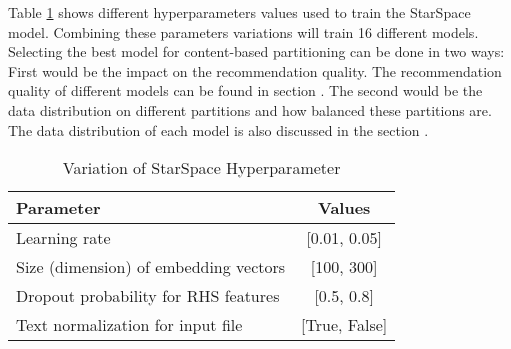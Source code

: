 Table \ref{tab:hyperparameter-variations} shows different hyperparameters values used to train the StarSpace model. Combining these parameters variations will train 16 different models. Selecting the best model for content-based partitioning can be done in two ways: First would be the impact on the recommendation quality. The recommendation quality of different models can be found in section . The second would be the data distribution on different partitions and how balanced these partitions are. The data distribution of each model is also discussed in the section .


\begin{table}[!h]
	\centering
	\caption{Variation of StarSpace Hyperparameter}
	\label{tab:hyperparameter-variations}
	\begin{tabular}{|l|c|}
		\hline
		\textbf{Parameter} & \textbf{Values} \\
		\hline
		Learning rate & [0.01, 0.05] \\
		\hline
		Size (dimension) of embedding vectors & [100, 300] \\
		\hline
		Dropout probability for RHS features & [0.5, 0.8] \\
		\hline
		Text normalization for input file & [True, False]\\
		\hline
	\end{tabular}
\end{table}

